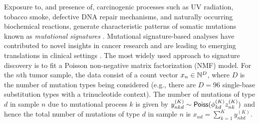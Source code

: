 Exposure to, and presence of, carcinogenic processes such as UV radiation, tobacco smoke, defective DNA repair mechanisms, and naturally occurring biochemical reactions, generate characteristic patterns of somatic mutations known as \emph{mutational signatures} \citep{Alexandrov_mut-sig-NMF_2013,Nik-zainal_MutationalProcessesMolding_2012}.
Mutational signature-based analyses have contributed to novel insights in cancer research \citep[e.g.,][]{Alexandrov_mut-sig-NMF_2013,Nik-zainal_MutationalProcessesMolding_2012,pcawgSV:2020,pcawg2020} and are leading to emerging translations in clinical settings \citep[e.g.,][]{Chakravarty:2021}.
The most widely used approach to signature discovery is to fit a Poisson non-negative matrix factorization (NMF) model. %
For the $n$th tumor sample, the data consist of a count vector ${x}_{n}\in\mathbb{N}^{D}$,
where $D$ is the number of mutation types being considered (e.g., there are $D=96$ single-base substitution types with a trinucleotide context).
The number of mutations of type $d$ in sample $n$ due to mutational process $k$ is given by
$y^{(K)}_{nkd} \sim {\sf{Poiss}}({\phi}^{(K)}_{kd}z^{(K)}_{nk})$ and hence the total number of mutations of type $d$ in sample $n$ is $x_{nd} = \sum_{k=1}^K y^{(K)}_{nkd}$.

